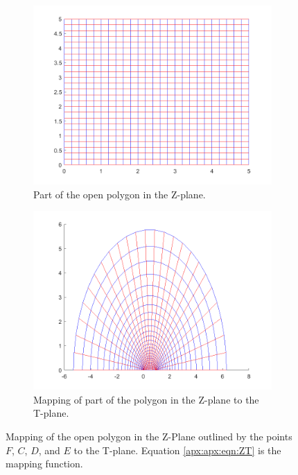      \begin{figure}[h]
    \centering
    \begin{subfigure}[t]{0.45\textwidth}
        \centering
        \includegraphics[width=\textwidth]{images/ZtoT_strip.png}
        \caption{Part of the open polygon in the Z-plane.}
    \end{subfigure}
    \hfill
    \begin{subfigure}[t]{0.45\textwidth}
        \centering
        \includegraphics[width=\textwidth]{images/ZtoT_map.png}
        \caption{Mapping of part of the polygon in the Z-plane to the T-plane.}
    \end{subfigure} 
    \caption[Mapping of the open polygon in the Z-Plane to the T-plane.]{Mapping of the open polygon in the Z-Plane outlined by the points $F$, $C$, $D$, and $E$ to the T-plane. Equation \ref{apx:apx:eqn:ZT} is the mapping function.} 
    \label{apx:apx:fig:Z_to_T_mapping}
 \end{figure}

